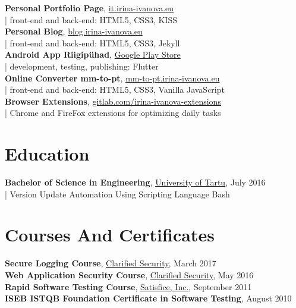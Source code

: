 \documentclass[a4paper, 12pt]{article}
\begin{document}
\textbf{Personal Portfolio Page}, \href{https://it.irina-ivanova.eu}{it.irina-ivanova.eu}\\
\indent | front-end and back-end: HTML5, CSS3, KISS\\
\textbf{Personal Blog}, \href{https://blog.irina-ivanova.eu}{blog.irina-ivanova.eu}\\
\indent | front-end and back-end: HTML5, CSS3, Jekyll\\
\textbf{Android App Riigipühad}, \href{https://play.google.com/store/apps/details?id=ee.vimo.riigipyhad}{Google Play Store}\\
\indent | development, testing, publishing: Flutter\\
\textbf{Online Converter mm-to-pt}, \href{https://mm-to-pt.irina-ivanova.eu}{mm-to-pt.irina-ivanova.eu}\\
\indent | front-end and back-end: HTML5, CSS3, Vanilla JavaScript\\
\textbf{Browser Extensions}, \href{https://gitlab.com/irina-ivanova-extensions}{gitlab.com/irina-ivanova-extensions}\\
\indent | Chrome and FireFox extensions for optimizing daily tasks\\

\pagestyle{empty}

\newpage

\section{Education}

\textbf{Bachelor of Science in Engineering}, \href{https://www.ut.ee/en}{University of Tartu}, July 2016\\
\indent | Version Update Automation Using Scripting Language Bash

\section{Courses And Certificates}

\textbf{Secure Logging Course}, \href{https://clarifiedsecurity.com/secure-logging-training/}{Clarified Security}, March 2017\\
\textbf{Web Application Security Course}, \href{https://www.clarifiedsecurity.com/web-application-security-training/}{Clarified Security}, May 2016\\
\textbf{Rapid Software Testing Course}, \href{http://www.satisfice.com/info_rst.shtml}{Satisfice, Inc.}, September 2011\\
\textbf{ISEB ISTQB Foundation Certificate in Software Testing}, August 2010
\end{document}
